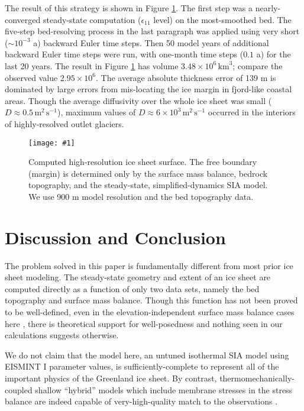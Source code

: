 \documentclass[twocolumn,letterpaper]{igs}
\newcommand{\onecol}[1]{\texttt{[image: \#1]}}
\newcommand\eps{\epsilon}
\begin{document}
The result of this strategy is shown in Figure \ref{fig:grnwinset}.  The first step was a nearly-converged steady-state computation ($\eps_{11}$ level) on the most-smoothed bed.  The five-step bed-resolving process in the last paragraph was applied using very short ($\sim10^{-3}$ a) backward Euler time steps.  Then 50 model years of additional backward Euler time steps were run, with one-month time steps ($0.1$ a) for the last 20 years.  The result in Figure \ref{fig:grnwinset} has volume $3.48\times 10^6\,\text{km}^3$; compare the observed value $2.95\times 10^6$.  The average absolute thickness error of 139 m is dominated by large errors from mis-locating the ice margin in fjord-like coastal areas.  Though the average diffusivity over the whole ice sheet was small ($D\approx 0.5\,\text{m}^2\,\text{s}^{-1}$), maximum values of $D\approx 6\times 10^3\,\text{m}^2\,\text{s}^{-1}$ occurred in the interiors of highly-resolved outlet glaciers.

\begin{figure}[ht]
\onecol{grnwinset.pdf}
\caption{Computed high-resolution ice sheet surface.  The free boundary (margin) is determined only by the surface mass balance, bedrock topography, and the steady-state, simplified-dynamics SIA model.  We use 900 m model resolution and the \MCB bed topography data.}
\label{fig:grnwinset}
\end{figure}


\section{Discussion and Conclusion}

The problem solved in this paper is fundamentally different from most prior ice sheet modeling.  The steady-state geometry and extent of an ice sheet are computed directly as a function of only two data sets, namely the bed topography and surface mass balance.  Though this function has not been proved to be well-defined, even in the elevation-independent surface mass balance cases here \citep[compare][]{Jouvetetal2011}, there is theoretical support for well-posedness \citep{JouvetBueler2012} and nothing seen in our calculations suggests otherwise.

We do not claim that the model here, an untuned isothermal SIA model using EISMINT I parameter values, is sufficiently-complete to represent all of the important physics of the Greenland ice sheet.  By contrast, thermomechanically-coupled shallow ``hybrid'' models which include membrane stresses in the stress balance are indeed capable of very-high-quality match to the observations \citep{Aschwandenetal2015}.
\end{document}

